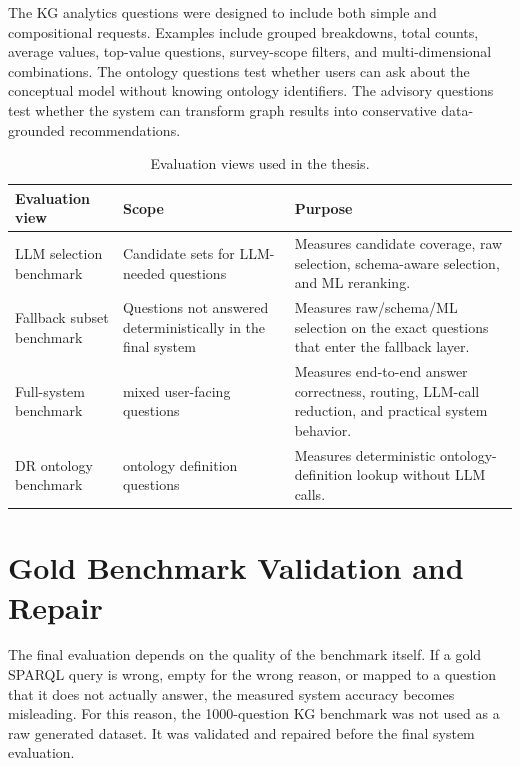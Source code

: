 \documentclass[
  12pt,
  english,
  oneside]{report}
\begin{document}
The KG analytics questions were designed to include both simple and compositional requests. Examples include grouped breakdowns, total counts, average values, top-value questions, survey-scope filters, and multi-dimensional combinations. The ontology questions test whether users can ask about the conceptual model without knowing ontology identifiers. The advisory questions test whether the system can transform graph results into conservative data-grounded recommendations.

\begin{table}[htbp]
\centering
\caption{Evaluation views used in the thesis.}
\label{tab:evaluation-views}
\small
\begin{tabularx}{\textwidth}{
>{\raggedright\arraybackslash}p{3.5cm}
>{\raggedright\arraybackslash}p{4.2cm}
>{\raggedright\arraybackslash}X
}
\toprule
\textbf{Evaluation view} & \textbf{Scope} & \textbf{Purpose} \\
\midrule
LLM selection benchmark & Candidate sets for LLM-needed questions & Measures candidate coverage, raw selection, schema-aware selection, and ML reranking. \\
Fallback subset benchmark & Questions not answered deterministically in the final system & Measures raw/schema/ML selection on the exact questions that enter the fallback layer. \\
Full-system benchmark & 1000 mixed user-facing questions & Measures end-to-end answer correctness, routing, LLM-call reduction, and practical system behavior. \\
DR ontology benchmark & 300 ontology definition questions & Measures deterministic ontology-definition lookup without LLM calls. \\
\bottomrule
\end{tabularx}
\end{table}

\section{Gold Benchmark Validation and Repair}
\label{sec:gold-benchmark-validation-repair}

The final evaluation depends on the quality of the benchmark itself. If a gold SPARQL query is wrong, empty for the wrong reason, or mapped to a question that it does not actually answer, the measured system accuracy becomes misleading. For this reason, the 1000-question KG benchmark was not used as a raw generated dataset. It was validated and repaired before the final system evaluation.
\end{document}
